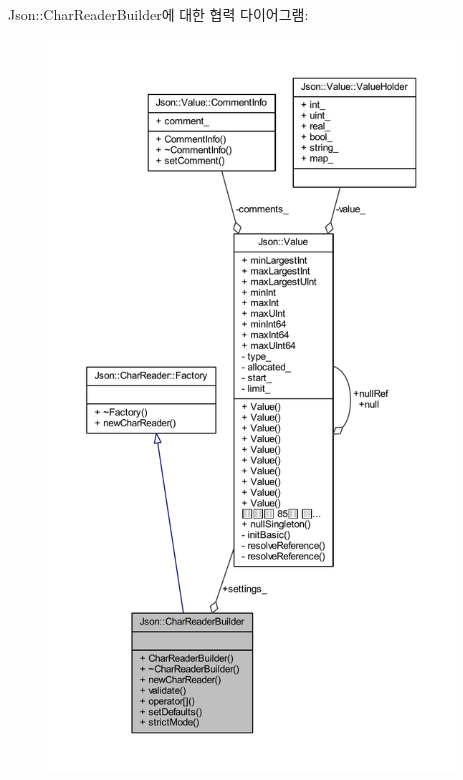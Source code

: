 Json\+:\+:Char\+Reader\+Builder에 대한 협력 다이어그램\+:
\nopagebreak
\begin{figure}[H]
\begin{center}
\leavevmode
\includegraphics[height=550pt]{class_json_1_1_char_reader_builder__coll__graph}
\end{center}
\end{figure}
